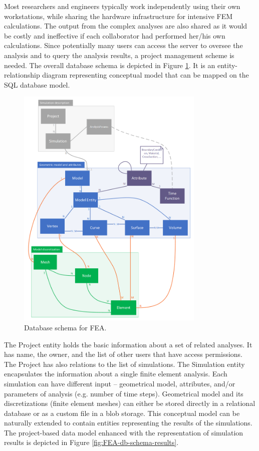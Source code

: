 Most researchers and engineers typically work independently using their own workstations, while sharing the hardware infrastructure for intensive FEM calculations. The output from the complex analyses are also shared as it would be costly and ineffective if each collaborator had performed her/his own calculations. Since potentially many users can access the server to oversee the analysis and to query the analysis results, a project management scheme is needed. The overall database schema is depicted in Figure \ref{fig:FEA-db-schema}. It is an entity-relationship diagram representing conceptual model that can be mapped on the SQL database model.

\begin{figure}[H]
    \centering
    \includegraphics[width=0.8\textwidth]{figures/FEA-database-schema}
    \decoRule
    \caption{Database schema for FEA.}
    \label{fig:FEA-db-schema}
\end{figure}

The Project entity holds the basic information about a set of related analyses. It has name, the owner, and the list of other users that have access permissions. The Project has also relations to the list of simulations. The Simulation entity encapsulates the information about a single finite element analysis. Each simulation can have different input -- geometrical model, attributes, and/or parameters of analysis (e.g. number of time steps). Geometrical model and its discretizations (finite element meshes) can either be stored directly in a relational database or as a custom file in a blob storage. This conceptual model can be naturally extended to contain entities representing the results of the simulations. The project-based data model enhanced with the representation of simulation results is depicted in Figure \ref{fig:FEA-db-schema-results}.


